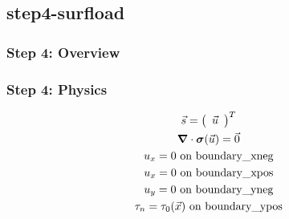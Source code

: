 \documentclass[aspectratio=169]{beamer}
\begin{document}
\subsection{step4-surfload}

\begin{frame}
  \frametitle{Step 4: Overview}

      
\end{frame}


\begin{frame}
  \frametitle{Step 4: Physics}
  \summary{}

  \begin{minipage}{0.3\textwidth}
    {\scriptsize
      \begin{gather*}
        \vec{s} = \left(\begin{array}{c} \vec{u} \end{array}\right)^T \\
        \bm{\nabla} \cdot \bm{\sigma}(\vec{u}) = \vec{0} \\
        u_x = 0 \text{ on boundary\_xneg} \\
        u_x = 0 \text{ on boundary\_xpos} \\
        u_y = 0 \text{ on boundary\_yneg} \\
        \tau_n = \tau_0(\vec{x}) \text{ on boundary\_ypos}
    \end{gather*}}
  \end{minipage}
  \hfill
  \begin{minipage}{0.67\textwidth}
  \end{minipage}
      
\end{frame}
\end{document}
